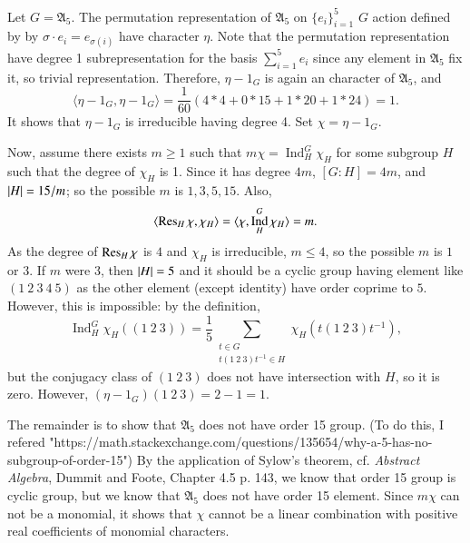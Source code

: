 \documentclass[a4paper, 12pt]{article}
\theoremstyle{Mydefinition}
\theoremstyle{Mytheorem}
\DeclareMathOperator{\Ind}{Ind}
\begin{document}
\begin{enumerate}
    Let $G=\mathfrak{A}_5$. The permutation representation of $\mathfrak{A}_5$ on $\{e_i\}_{i=1}^5$ $G$ action defined by by $\sigma\cdot e_i = e_{\sigma(i)}$ have character $\eta$. Note that the permutation representation have degree 1 subrepresentation for the basis $\sum_{i=1}^5 e_i$ since any element in $\mathfrak{A}_5$ fix it, so trivial representation. Therefore, $\eta-1_G$ is again an character of $\mathfrak{A}_5$, and
    \begin{equation}
        \langle \eta-1_G, \eta-1_G\rangle = \frac{1}{60}\left(4*4 + 0 * 15 + 1 * 20 + 1 * 24\right) = 1.
    \end{equation}
    It shows that $\eta-1_G$ is irreducible having degree 4. Set $\chi = \eta-1_G$.
    
    Now, assume there exists $m\geq 1$ such that $m\chi=\Ind_H^G \chi_H$ for some subgroup $H$ such that the degree of $\chi_H$ is 1. Since it has degree $4m$, $[G:H]=4m$, and $\abs{H}=15/m$; so the possible $m$ is $1,3,5,15$. Also,
    \begin{equation}
        \langle \Res_H \chi, \chi_H\rangle = \langle \chi, \Ind_H^G\chi_H\rangle = m.
    \end{equation}
    As the degree of $\Res_H \chi$ is $4$ and $\chi_H$ is irreducible, $m\leq 4$, so the possible $m$ is $1$ or $3$. If $m$ were $3$, then $\abs{H}=5$ and it should be a cyclic group having element like $(1~2~3~4~5)$ as the other element (except identity) have order coprime to $5$. However, this is impossible: by the definition,
    \begin{equation}
        \Ind_H^G\chi_H((1~2~3)) = \frac{1}{5}\sum_{\substack{t\in G\\t(1~2~3)t^{-1}\in H}}\chi_H(t(1~2~3)t^{-1}),
    \end{equation}
    but the conjugacy class of $(1~2~3)$ does not have intersection with $H$, so it is zero. However, $(\eta-1_G)(1~2~3) = 2-1 = 1$.
    
    The remainder is to show that $\mathfrak{A}_5$ does not have order 15 group. (To do this, I refered "https://math.stackexchange.com/questions/135654/why-a-5-has-no-subgroup-of-order-15") By the application of Sylow's theorem, cf. \textit{Abstract Algebra}, Dummit and Foote, Chapter 4.5 p. 143, we know that order 15 group is cyclic group, but we know that $\mathfrak{A}_5$ does not have order 15 element. Since $m\chi$ can not be a monomial, it shows that $\chi$ cannot be a linear combination
    with positive real coefficients of monomial characters.
\end{enumerate}
\end{document}
